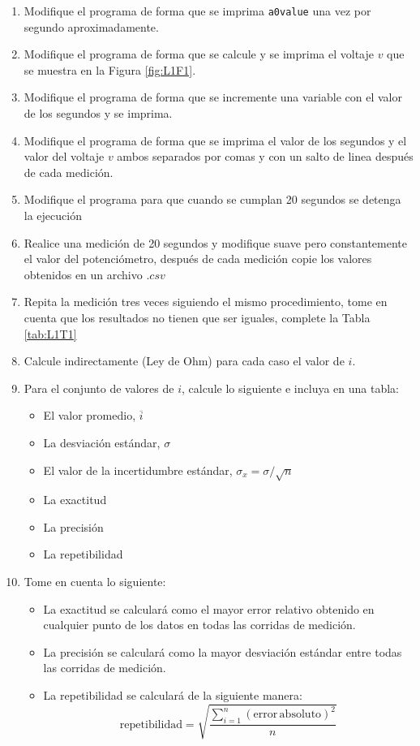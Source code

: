 \begin{enumerate}
\item Modifique el programa de forma que se imprima \lstinline{a0value} una vez por segundo aproximadamente.
\item Modifique el programa de forma que se calcule y se imprima el voltaje $v$ que se muestra en la Figura \ref{fig:L1F1}.
\item Modifique el programa de forma que se incremente una variable con el valor de los segundos y se imprima.
\item Modifique el programa de forma que se imprima el valor de los segundos y el valor del voltaje $v$ ambos separados por comas y con un salto de linea después de cada medición.
\item Modifique el programa para que cuando se cumplan 20 segundos se detenga la ejecución
\item Realice una medición de 20 segundos y modifique suave pero constantemente el valor del potenciómetro, después de cada medición copie los valores obtenidos en un archivo $.csv$
\item Repita la medición tres veces siguiendo el mismo procedimiento, tome en cuenta que los resultados no tienen que ser iguales, complete la Tabla \ref{tab:L1T1}
\item Calcule indirectamente (Ley de Ohm) para cada caso el valor de $i$.
\item Para el conjunto de valores de $i$, calcule lo siguiente e incluya en una tabla:
    \begin{itemize}
        \item El valor promedio, $\overline{i}$ 
        \item La desviación estándar, $\sigma$
        \item El valor de la incertidumbre estándar, $\sigma_x = \sigma / \sqrt{n}$
        \item La exactitud
        \item La precisión
        \item La repetibilidad
    \end{itemize}
    
\item Tome en cuenta lo siguiente:
    \begin{itemize}
        \item La exactitud se calculará como el mayor error relativo obtenido en cualquier punto de los datos en todas las corridas de medición.
        \item La precisión se calculará como la mayor desviación estándar entre todas las corridas de medición.
        \item La repetibilidad se calculará de la siguiente manera:
        \begin{equation*}
            \mathrm{repetibilidad} = \sqrt{\dfrac{\sum_{i=1}^n(\mathrm{error\,absoluto})^2}{n}}
        \end{equation*}
    \end{itemize}



\end{enumerate}
